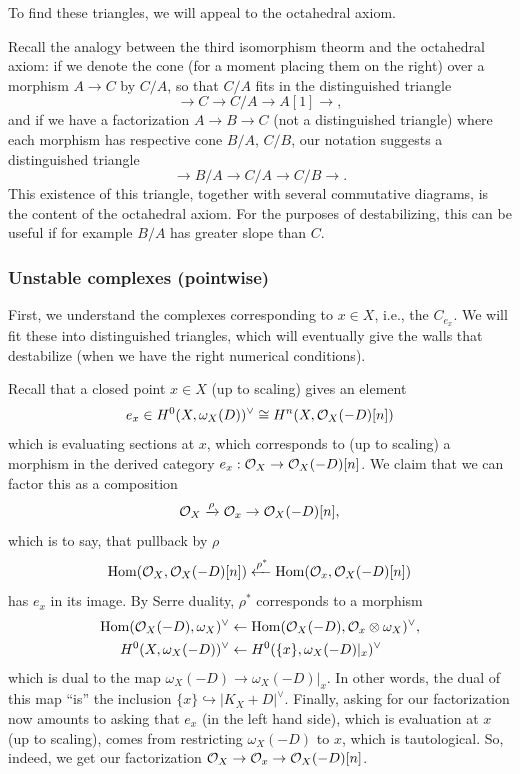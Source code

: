 \documentclass[12pt]{article}
\begin{document}
To find these triangles, we will appeal to the octahedral axiom.

\begin{rmk}
    Recall the analogy between the third isomorphism theorm and the octahedral axiom: if we denote the cone (for a moment placing them on the right) over a morphism $A\to C$ by $C/A$, so that $C/A$ fits in the distinguished triangle
    \[\to C\to C/A \to A[1]\to,\]
    and if we have a factorization $A\to B\to C$ (not a distinguished triangle) where each morphism has respective cone $B/A$, $C/B$, our notation suggests a distinguished triangle
    \[\to B/A \to C/A \to C/B \to.\]
    This existence of this triangle, together with several commutative diagrams, is the content of the octahedral axiom. For the purposes of destabilizing, this can be useful if for example $B/A$ has greater slope than $C$.
\end{rmk}

\subsubsection{Unstable complexes (pointwise)}

First, we understand the complexes corresponding to $x\in X$, i.e., the $C_{e_x}$. We will fit these into distinguished triangles, which will eventually give the walls that destabilize (when we have the right numerical conditions).

Recall that a closed point $x\in X$ (up to scaling) gives an element
\[e_x\in H^0(X,\omega_X(D))^\vee \cong H^n(X,\mathcal{O}_X(-D)[n])\]
which is evaluating sections at $x$, which corresponds to (up to scaling) a morphism in the derived category $e_x: \mathcal{O}_X \to \mathcal{O}_X(-D)[n]$. We claim that we can factor this as a composition
\[\mathcal{O}_X \xrightarrow{\rho} \mathcal{O}_x \to \mathcal{O}_X(-D)[n],\]
which is to say, that pullback by $\rho$
\[\mathrm{Hom}(\mathcal{O}_X,\mathcal{O}_X(-D)[n]) \xleftarrow{\rho^*} \mathrm{Hom}(\mathcal{O}_x, \mathcal{O}_X(-D)[n])\]
has $e_x$ in its image. By Serre duality, $\rho^*$ corresponds to a morphism
\begin{align*}
    \mathrm{Hom}(\mathcal{O}_X(-D),\omega_X)^\vee &\leftarrow \mathrm{Hom}(\mathcal{O}_X(-D),\mathcal{O}_x \otimes \omega_X)^\vee,\\
    H^0(X,\omega_X(-D))^\vee &\leftarrow H^0(\{x\},\omega_X(-D)|_x)^\vee
\end{align*}
which is dual to the map $\omega_X(-D)\to \omega_X(-D)|_x$. In other words, the dual of this map ``is'' the inclusion $\{x\}\hookrightarrow |K_X+D|^\vee$. Finally, asking for our factorization now amounts to asking that $e_x$ (in the left hand side), which is evaluation at $x$ (up to scaling), comes from restricting $\omega_X(-D)$ to $x$, which is tautological. So, indeed, we get our factorization $\mathcal{O}_X\to \mathcal{O}_x \to \mathcal{O}_X(-D)[n]$.
\end{document}
